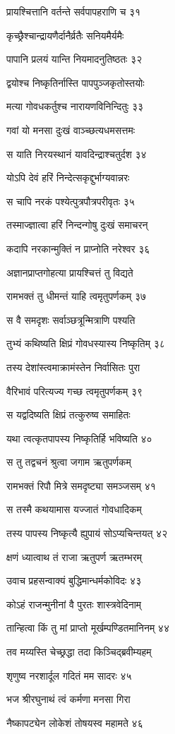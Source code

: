प्रायश्चित्तानि वर्तन्ते सर्वपापहराणि च ३१

कृच्छ्रैश्चान्द्रायणैर्दानैर्व्रतैः सनियमैर्यमैः

पापानि प्रलयं यान्ति नियमादनुतिष्ठतः ३२

द्वयोश्च निष्कृतिर्नास्ति पापपुञ्जकृतोस्तयोः

मत्या गोवधकर्तुश्च नारायणविनिन्दितुः ३३

गवां यो मनसा दुःखं वाञ्च्छत्यधमसत्तमः

स याति निरयस्थानं यावदिन्द्राश्चतुर्दश ३४

योऽपि देवं हरिं निन्देत्सकृद्दुर्भाग्यवान्नरः

स चापि नरकं पश्येत्पुत्रपौत्रपरीवृतः ३५

तस्माज्ज्ञात्वा हरिं निन्दन्गोषु दुःखं समाचरन्

कदापि नरकान्मुक्तिं न प्राप्नोति नरेश्वर ३६

अज्ञानप्राप्तगोहत्या प्रायश्चित्तं तु विद्यते

रामभक्तं तु धीमन्तं याहि त्वमृतुपर्णकम् ३७

स वै समदृशः सर्वाञ्छत्रून्मित्राणि पश्यति

तुभ्यं कथिष्यति क्षिप्रं गोवधस्यास्य निष्कृतिम् ३८

तस्य देशांस्त्वमाक्रामंस्तेन निर्वासितः पुरा

वैरिभावं परित्यज्य गच्छ त्वमृतुपर्णकम् ३९

स यद्वदिष्यति क्षिप्रं तत्कुरुष्व समाहितः

यथा त्वत्कृतपापस्य निष्कृतिर्हि भविष्यति ४०

स तु तद्वचनं श्रुत्वा जगाम ऋतुपर्णकम्

रामभक्तं रिपौ मित्रे समदृष्ट्या समञ्जसम् ४१

स तस्मै कथयामास यज्जातं गोवधादिकम्

तस्य पापस्य निष्कृत्यै ह्युपायं सोऽप्यचिन्तयत् ४२

क्षणं ध्यात्वाथ तं राजा ऋतुपर्ण ऋतम्भरम्

उवाच प्रहसन्वाक्यं बुद्धिमान्धर्मकोविदः ४३

कोऽहं राजन्मुनीनां वै पुरतः शास्त्रवेदिनाम्

तान्हित्वा किं तु मां प्राप्तो मूर्खम्पण्डितमानिनम् ४४

तव मय्यस्ति चेच्छ्रद्धा तदा किञ्चिद्ब्रवीम्यहम्

शृणुष्व नरशार्दूल गदितं मम सादरः ४५

भज श्रीरघुनाथं त्वं कर्मणा मनसा गिरा

नैष्कापट्येन लोकेशं तोषयस्व महामते ४६

